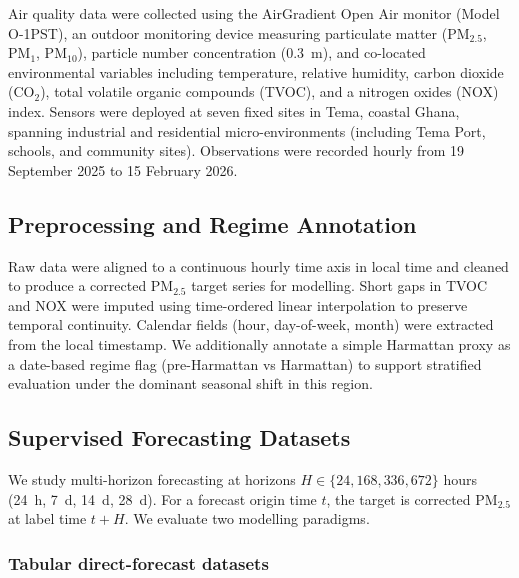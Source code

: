 \documentclass[a4paper,fleqn]{cas-sc}
\begin{document}
Air quality data were collected using the AirGradient Open Air monitor (Model O-1PST), an outdoor monitoring device measuring particulate matter (PM$_{2.5}$, PM$_1$, PM$_{10}$), particle number concentration (0.3~\textmu m), and co-located environmental variables including temperature, relative humidity, carbon dioxide (CO$_2$), total volatile organic compounds (TVOC), and a nitrogen oxides (NOX) index. Sensors were deployed at seven fixed sites in Tema, coastal Ghana, spanning industrial and residential micro-environments (including Tema Port, schools, and community sites). Observations were recorded hourly from 19 September 2025 to 15 February 2026.

\subsection{Preprocessing and Regime Annotation}

Raw data were aligned to a continuous hourly time axis in local time and cleaned to produce a corrected PM$_{2.5}$ target series for modelling. Short gaps in TVOC and NOX were imputed using time-ordered linear interpolation to preserve temporal continuity. Calendar fields (hour, day-of-week, month) were extracted from the local timestamp. We additionally annotate a simple Harmattan proxy as a date-based regime flag (pre-Harmattan vs Harmattan) to support stratified evaluation under the dominant seasonal shift in this region.

\subsection{Supervised Forecasting Datasets}

We study multi-horizon forecasting at horizons \(H \in \{24,168,336,672\}\) hours (24~h, 7~d, 14~d, 28~d). For a forecast origin time \(t\), the target is corrected PM$_{2.5}$ at label time \(t+H\). We evaluate two modelling paradigms.

\subsubsection{Tabular direct-forecast datasets}
\end{document}
